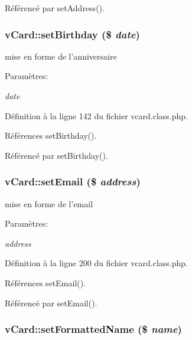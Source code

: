 R\'{e}f\'{e}renc\'{e} par set\-Address().\hypertarget{classvCard_a4}{
\subsubsection[setBirthday]{\setlength{\rightskip}{0pt plus 5cm}v\-Card::set\-Birthday (\$ {\em date})}}
\label{classvCard_a4}


mise en forme de l'anniversaire 

\begin{Desc}
\item[Param\`{e}tres:]
\begin{description}
\item[{\em date}]\end{description}
\end{Desc}


D\'{e}finition \`{a} la ligne 142 du fichier vcard.class.php.

R\'{e}f\'{e}rences set\-Birthday().

R\'{e}f\'{e}renc\'{e} par set\-Birthday().\hypertarget{classvCard_a7}{
\subsubsection[setEmail]{\setlength{\rightskip}{0pt plus 5cm}v\-Card::set\-Email (\$ {\em address})}}
\label{classvCard_a7}


mise en forme de l'email 

\begin{Desc}
\item[Param\`{e}tres:]
\begin{description}
\item[{\em address}]\end{description}
\end{Desc}


D\'{e}finition \`{a} la ligne 200 du fichier vcard.class.php.

R\'{e}f\'{e}rences set\-Email().

R\'{e}f\'{e}renc\'{e} par set\-Email().\hypertarget{classvCard_a2}{
\subsubsection[setFormattedName]{\setlength{\rightskip}{0pt plus 5cm}v\-Card::set\-Formatted\-Name (\$ {\em name})}}
\label{classvCard_a2}


